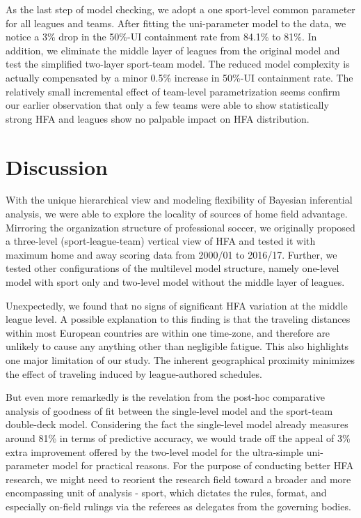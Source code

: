 \documentclass[USenglish]{article}
\begin{document}
As the last step of model checking, we adopt a one sport-level common parameter for all leagues and teams. After fitting the uni-parameter model to the data, we notice a 3\%  drop in the 50\%-UI containment rate from 84.1\% to 81\%.
In addition, we eliminate the middle layer of leagues from the original model and test the simplified two-layer sport-team model. The reduced model complexity is actually compensated by a minor 0.5\% increase in 50\%-UI containment rate.  
The relatively small incremental effect of team-level parametrization seems confirm our earlier observation that only a few teams were able to show statistically strong HFA and leagues show no palpable impact on HFA distribution.



\section{Discussion}

With the unique hierarchical view and modeling flexibility of Bayesian inferential analysis, we were able to explore the locality of sources of home field advantage. Mirroring the organization structure of professional soccer, we originally proposed a three-level (sport-league-team) vertical view of HFA and tested it with maximum home and away scoring data from 2000/01 to 2016/17. Further, we tested other configurations of the multilevel model structure, namely one-level model with sport only and two-level model without the middle layer of leagues. 



Unexpectedly, we found that no signs of significant HFA variation at the middle league level. 
A possible explanation to this finding is that the traveling distances within most European countries are within one time-zone, and therefore are unlikely to cause any anything other than negligible fatigue. This also highlights one major limitation of our study.  The inherent geographical proximity minimizes the effect of traveling induced by league-authored schedules.

But even more remarkedly is the revelation from the post-hoc comparative analysis of goodness of fit between the single-level model and the sport-team double-deck model. Considering the fact the single-level model already measures around 81\% in terms of predictive accuracy, we would trade off the appeal of 3\% extra improvement offered by the two-level model for the ultra-simple uni-parameter model for practical reasons. For the purpose of conducting better HFA research, we might need to reorient the research field toward a broader and more encompassing unit of analysis - sport, which dictates the rules, format, and especially on-field rulings via the referees as delegates from the governing bodies.
\end{document}
